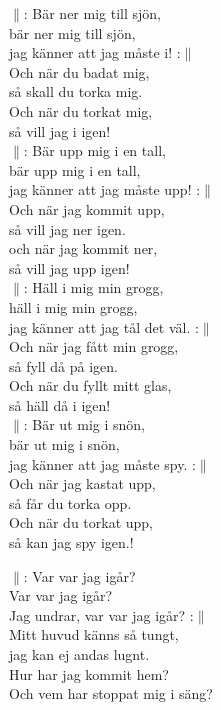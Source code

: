 \documentclass[a6paper,10pt]{article}
\begin{document}
\setlength{\oddsidemargin}{-0.47in}
\begin{center}
\end{center}
\begin{lyrics}
$\|$: Bär ner mig till sjön, \\
bär ner mig till sjön, \\
jag känner att jag måste i! :$\|$ \\
Och när du badat mig, \\
så skall du torka mig. \\
Och när du torkat mig, \\
så vill jag i igen! 
\vspace{5pt}\\
$\|$: Bär upp mig i en tall,\\
bär upp mig i en tall,\\
jag känner att jag måste upp! :$\|$ \\
Och när jag kommit upp,\\
så vill jag ner igen. \\
och när jag kommit ner,\\
så vill jag upp igen! 
\vspace{5pt}\\
$\|$: Häll i mig min grogg,\\
häll i mig min grogg,\\
jag känner att jag tål det väl. :$\|$\\
Och när jag fått min grogg, \\
så fyll då på igen. \\
Och när du fyllt mitt glas, \\
så häll då i igen! 
\vspace{5pt}\\
$\|$: Bär ut mig i snön, \\
bär ut mig i snön, \\
jag känner att jag måste spy. :$\|$ \\
Och när jag kastat upp, \\
så får du torka opp. \\
Och när du torkat upp, \\
så kan jag spy igen.!

\setlength{\oddsidemargin}{-0.37in}
\noindent
$\|$: Var var jag igår? \\
Var var jag igår? \\
Jag undrar, var var jag igår? :$\|$\\
Mitt huvud känns så tungt, \\
jag kan ej andas lugnt. \\
Hur har jag kommit hem? \\
Och vem har stoppat mig i säng? 
\end{lyrics}
\end{document}
